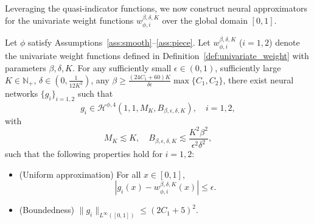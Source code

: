 \documentclass[11pt]{article}
\begin{document}
Leveraging the quasi-indicator functions, we now construct neural approximators for the univariate weight functions $w_{\phi,i}^{\beta, \delta, K}$ over the global domain $[0,1]$.
\begin{lemma}
    Let $\phi$ satisfy Assumptions~\ref{ass:smooth}--\ref{ass:piece}. 
    Let $w_{\phi,i}^{\beta, \delta, K}$ ($i=1,2$) denote the univariate weight functions defined in Definition~\ref{def:univariate_weight} with parameters $\beta, \delta, K$. For any sufficiently small $\epsilon \in (0,1)$, sufficiently large $K \in \mathbb{N}_{+}$, $\delta \in (0, \frac{1}{12K^2})$, any $\beta \geq \frac{(24C_1+ 60) K}{\delta \epsilon} \max \{C_1, C_2\}$, there exist neural networks $\{g_i\}_{i=1,2}$ such that
    \begin{equation*}
        g_i \in \mathcal{H}^{\phi,4}(1,1, M_K, B_{\beta, \epsilon,\delta,K}), \quad i=1,2,
    \end{equation*}
    with 
    \begin{equation}
        M_K \lesssim K, \quad B_{\beta, \epsilon,\delta,K} \lesssim \frac{K^2 \beta^2}{ \epsilon^2 \delta^2},
        \label{eq:width-norm-app-weight-global}
    \end{equation}
    such that the following properties hold for $i=1,2$:
    \begin{itemize}
        \item (Uniform approximation) For all $x \in [0,1]$, 
        \begin{equation*}
            |g_i(x) - w_{\phi,i}^{\beta,\delta,K} (x)|  \leq \epsilon.
        \end{equation*}
        \item (Boundedness) $\|g_i\|_{L^{\infty}([0,1])} \leq (2C_1 + 5)^2$.
    \end{itemize}
    \label{lem:app_univariate_weight_Linfty}
\end{lemma}
\end{document}
